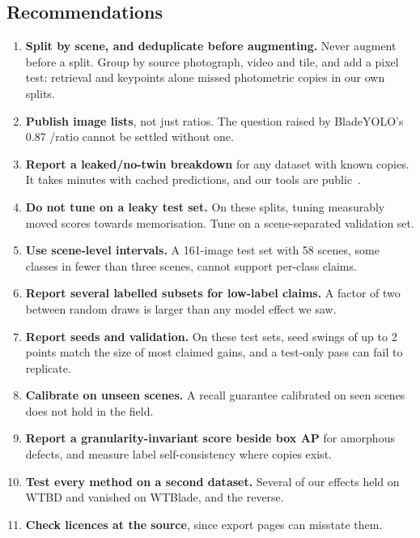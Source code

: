 \subsection{Recommendations}
\begin{enumerate}
\item \textbf{Split by scene, and deduplicate before augmenting.} Never augment before a split. Group by source photograph, video and tile, and add a pixel test: retrieval and keypoints alone missed photometric copies in our own splits.
\item \textbf{Publish image lists}, not just ratios. The question raised by BladeYOLO's 0.87 \mcoco/\mfifty ratio cannot be settled without one.
\item \textbf{Report a leaked/no-twin breakdown} for any dataset with known copies. It takes minutes with cached predictions, and our tools are public~\cite{repo}.
\item \textbf{Do not tune on a leaky test set.} On these splits, tuning measurably moved scores towards memorisation. Tune on a scene-separated validation set.
\item \textbf{Use scene-level intervals.} A 161-image test set with 58 scenes, some classes in fewer than three scenes, cannot support per-class claims.
\item \textbf{Report several labelled subsets for low-label claims.} A factor of two between random draws is larger than any model effect we saw.
\item \textbf{Report seeds and validation.} On these test sets, seed swings of up to 2 \mcoco points match the size of most claimed gains, and a test-only pass can fail to replicate.
\item \textbf{Calibrate on unseen scenes.} A recall guarantee calibrated on seen scenes does not hold in the field.
\item \textbf{Report a granularity-invariant score beside box AP} for amorphous defects, and measure label self-consistency where copies exist.
\item \textbf{Test every method on a second dataset.} Several of our effects held on WTBD and vanished on WTBlade, and the reverse.
\item \textbf{Check licences at the source}, since export pages can misstate them.
\end{enumerate}

